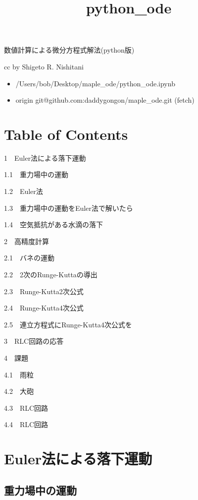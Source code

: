 \documentclass[11pt,dvipdfmx]{jsarticle}
\title{python\_ode}
\providecommand{\tightlist}{%
      \setlength{\itemsep}{0pt}\setlength{\parskip}{0pt}}
\begin{document}
    
    
    \maketitle
    
    

    
    数値計算による微分方程式解法(python版)

cc by Shigeto R. Nishitani

\begin{itemize}
\tightlist
\item
  /Users/bob/Desktop/maple\_ode/python\_ode.ipynb
\item
  origin git@github.com:daddygongon/maple\_ode.git (fetch)
\end{itemize}

    \section{Table of Contents}\label{table-of-contents}

{1~~}Euler法による落下運動

{1.1~~}重力場中の運動

{1.2~~}Euler法

{1.3~~}重力場中の運動をEuler法で解いたら

{1.4~~}空気抵抗がある水滴の落下

{2~~}高精度計算

{2.1~~}バネの運動

{2.2~~}2次のRunge-Kuttaの導出

{2.3~~}Runge-Kutta2次公式

{2.4~~}Runge-Kutta4次公式

{2.5~~}連立方程式にRunge-Kutta4次公式を

{3~~}RLC回路の応答

{4~~}課題

{4.1~~}雨粒

{4.2~~}大砲

{4.3~~}RLC回路

{4.4~~}RLC回路

    \section{Euler法による落下運動}\label{eulerux6cd5ux306bux3088ux308bux843dux4e0bux904bux52d5}

\subsection{重力場中の運動}\label{ux91cdux529bux5834ux4e2dux306eux904bux52d5}
\end{document}
